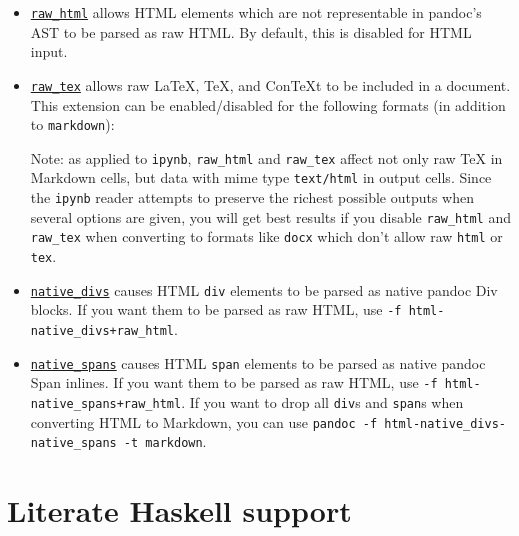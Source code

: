 \documentclass[
  b5paper
]{book}
\providecommand{\tightlist}{%
  \setlength{\itemsep}{0pt}\setlength{\parskip}{0pt}}
\begin{document}
\begin{itemize}
\item
  \hyperref[extension-raw_html]{\texttt{raw\_html}} allows HTML elements
  which are not representable in pandoc's AST to be parsed as raw HTML.
  By default, this is disabled for HTML input.
\item
  \hyperref[extension-raw_tex]{\texttt{raw\_tex}} allows raw LaTeX, TeX,
  and ConTeXt to be included in a document. This extension can be
  enabled/disabled for the following formats (in addition to
  \texttt{markdown}):


  Note: as applied to \texttt{ipynb}, \texttt{raw\_html} and
  \texttt{raw\_tex} affect not only raw TeX in Markdown cells, but data
  with mime type \texttt{text/html} in output cells. Since the
  \texttt{ipynb} reader attempts to preserve the richest possible
  outputs when several options are given, you will get best results if
  you disable \texttt{raw\_html} and \texttt{raw\_tex} when converting
  to formats like \texttt{docx} which don't allow raw \texttt{html} or
  \texttt{tex}.
\item
  \hyperref[extension-native_divs]{\texttt{native\_divs}} causes HTML
  \texttt{div} elements to be parsed as native pandoc Div blocks. If you
  want them to be parsed as raw HTML, use
  \texttt{-f\ html-native\_divs+raw\_html}.
\item
  \hyperref[extension-native_spans]{\texttt{native\_spans}} causes HTML
  \texttt{span} elements to be parsed as native pandoc Span inlines. If
  you want them to be parsed as raw HTML, use
  \texttt{-f\ html-native\_spans+raw\_html}. If you want to drop all
  \texttt{div}s and \texttt{span}s when converting HTML to Markdown, you
  can use
  \texttt{pandoc\ -f\ html-native\_divs-native\_spans\ -t\ markdown}.
\end{itemize}

\section{Literate Haskell support}\label{literate-haskell-support}
\end{document}
